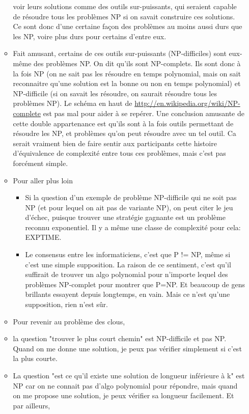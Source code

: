 \documentclass{article}
\begin{document}
\begin{itemize}
\begin{itemize}
voir leurs solutions comme des outils sur-puissants, qui seraient capable de
résoudre tous les problèmes NP si on savait construire ces solutions. Ce sont
donc d'une certaine façon des problèmes au moins aussi durs que les NP, voire
plus durs pour certains d'entre eux.
\item Fait amusant, certains de ces outils sur-puissants (NP-difficiles) sont
eux-même des problèmes NP. On dit qu'ils sont NP-complets. Ils sont donc à la
fois NP (on ne sait pas les résoudre en temps polynomial, mais on sait
reconnaitre qu'une solution est la bonne ou non en temps polynomial) et
NP-difficile (si on savait les résoudre, on saurait résoudre tous les problèmes
NP). Le schéma en haut de \url{http://en.wikipedia.org/wiki/NP-complete} est
pas mal pour aider à se repérer. Une conclusion amusante de cette double
appartenance est qu'ils sont à la fois outils permettant de résoudre les NP, et
problèmes qu'on peut résoudre avec un tel outil. Ca serait vraiment bien de
faire sentir aux participants cette histoire d'équivalence de complexité entre
tous ces problèmes, mais c'est pas forcément simple.
\item Pour aller plus loin
\begin{itemize}
\item Si la question d'un exemple de problème NP-difficile qui ne soit pas NP
(et pour lequel on ait pas de variante NP), on peut citer le jeu d'échec,
puisque trouver une stratégie gagnante est un problème reconnu exponentiel. Il
y a même une classe de complexité pour cela: EXPTIME.
\item Le consensus entre les informaticiens, c'est que P != NP, même si c'est
une simple supposition. La raison de ce sentiment, c'est qu'il suffirait de
trouver un algo polynomial pour n'importe lequel des problèmes NP-complet pour
montrer que P=NP. Et beaucoup de gens brillants essayent depuis longtemps, en
vain. Mais ce n'est qu'une supposition, rien n'est sûr.
\end{itemize}
\item Pour revenir au problème des clous,
\item la question "trouver le plus court chemin" est NP-difficile et pas NP.
Quand on me donne une solution, je peux pas vérifier simplement si c'est la
plus courte.
\item La question "est ce qu'il existe une solution de longueur inférieure à k"
est NP car on ne connait pas d'algo polynomial pour répondre, mais quand on me
propose une solution, je peux vérifier sa longueur facilement. Et par ailleurs,

\end{itemize}
\end{itemize}
\end{document}
